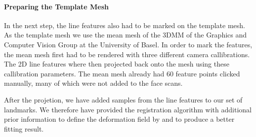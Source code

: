 \paragraph{Preparing the Template Mesh}
In the next step, the line features also had to be marked on the template mesh. As the template mesh we use the mean mesh of the 3DMM of the Graphics and Computer Vision Group at the University of Basel. In order to mark the features, the mean mesh first had to be rendered with three different camera callibrations. The 2D line features where then projected back onto the mesh using these callibration parameters. The mean mesh already had 60 feature points
clicked manually, many of which were not added to the face scans.

After the projetion, we have added samples from the line features to our set of landmarks. We therefore have provided the registration algorithm with additional prior information to define the deformation field by and to produce a better fitting result.

